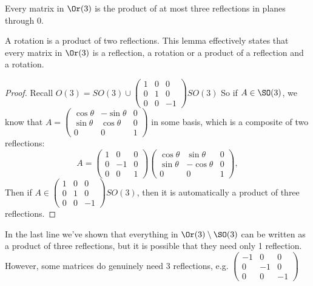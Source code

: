 \documentclass[a4pape]{article}
\begin{document}
\begin{lemma}
  Every matrix in $\Or(3)$ is the product of at most three reflections in planes through 0.
\end{lemma}
\note A rotation is a product of two reflections. This lemma effectively states that every matrix in $\Or(3)$ is a reflection, a rotation or a product of a reflection and a rotation.

\begin{proof}
  Recall $O(3) = SO(3) \cup 
  \begin{pmatrix}
    1 & 0 & 0\\
    0 & 1 & 0\\
    0 & 0 & -1
  \end{pmatrix}SO(3)$
  So if $A\in \SO(3)$, we know that $A = 
  \begin{pmatrix}
    \cos\theta & -\sin\theta & 0\\
    \sin\theta & \cos\theta & 0\\
    0 & 0 & 1
  \end{pmatrix}$ in some basis, which is a composite of two reflections:
  \[
  A = 
  \begin{pmatrix}
    1 & 0 & 0\\
    0 & -1 & 0\\
    0 & 0 & 1
  \end{pmatrix}
  \begin{pmatrix}
    \cos\theta & \sin\theta & 0\\
    \sin\theta & -\cos\theta & 0\\
    0 & 0 & 1
  \end{pmatrix},
  \]
  Then if $A\in \begin{pmatrix}
    1 & 0 & 0\\
    0 & 1 & 0\\
    0 & 0 & -1
  \end{pmatrix}SO(3)$, then it is automatically a product of three reflections.
\end{proof}
\note In the last line we've shown that everything in $\Or(3)\setminus \SO(3)$ can be written as a product of three reflections, but it is possible that they need only 1 reflection. However, some matrices do genuinely need 3 reflections, e.g.
$\begin{pmatrix}
  -1 & 0 & 0\\
  0 & -1 & 0\\
  0 & 0 & -1
\end{pmatrix}$
\end{document}
